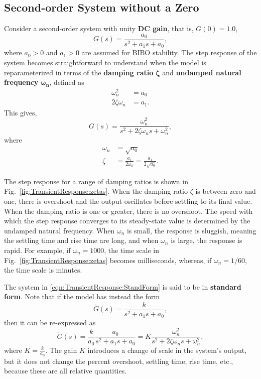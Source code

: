 \subsection{Second-order System without a Zero}
\label{sec:SecondOrderTransientResponse}

Consider a second-order system with unity \textbf{DC gain}, that is, $G(0)=1.0$,
\begin{equation}
G(s)= \frac{a_0}{s^2  + a_1 s + a_0},
\end{equation}
where $a_0>0$ and $a_1 > 0$ are assumed for BIBO stability. The step response of the system becomes straightforward to understand when the model is reparameterized in terms of the \textbf{damping ratio} $\bm{\zeta}$ and \textbf{undamped natural frequency} $\bm{\omega_n}$, defined as
\begin{align}
\omega _n^2  & = a_0 \\
2\zeta \omega _n & = a_1.
\end{align}
This gives,
\begin{equation}
G\left( s \right) = \frac{\omega _n^2 }{s^2  + 2\zeta \omega _n s + \omega _n^2 },
\label{eqn:TransientResponse:StandForm}
\end{equation}
where
\begin{align}
\omega _n  & = \sqrt{a_0} \\
\zeta&  = \frac{a_1}{{2\omega _n }} = \frac{a_1}{{2\sqrt{a_0} }}.
\end{align}


The step response for a range of damping ratios is shown in Fig.~\ref{fig:TransientResponse:zetas}. When the damping ratio $\zeta$ is between zero and one, there is overshoot and the output oscillates before settling to its final value. When the damping ratio is one or greater, there is no overshoot. The speed with which the step response converges to its steady-state value is determined by the undamped natural frequency. When $\omega_n$ is small, the response is sluggish, meaning the settling time and rise time are long, and when $\omega_n$ is large, the response is rapid. For example, if $\omega_n=1000$, the time scale in Fig.~\ref{fig:TransientResponse:zetas} becomes milliseconds, whereas, if $\omega_n=1/60$, the time scale is minutes.


The system in \eqref{eqn:TransientResponse:StandForm} is said to be in \textbf{standard form}. Note that if the model has instead the form
\begin{equation}
\widetilde{G}\left( s \right) = \frac{k}{s^2  + a_1 s + a_0},
\end{equation}
then it can be re-expressed as
\begin{equation}
\widetilde{G}\left( s \right) = \frac{k}{a_0}\frac{a_0}{s^2  + a_1 s + a_0} = K\frac{\omega _n^2 }{s^2  + 2\zeta \omega _n s + \omega _n^2 },
\end{equation}
where $K=\frac{k}{a_0}$. The gain $K$ introduces a change of scale in the system's output, but it does not change the percent overshoot, settling time, rise time, etc., because these are all relative quantities.


